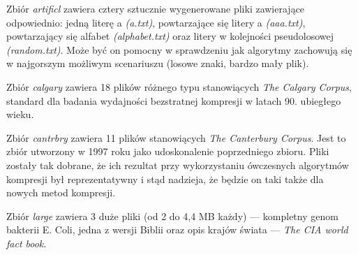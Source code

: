 Zbiór {\em artificl} zawiera cztery sztucznie wygenerowane pliki
zawierające odpowiednio: jedną literę a {\em (a.txt)}, powtarzające się
litery a {\em (aaa.txt)}, powtarzający się alfabet {\em (alphabet.txt)} oraz
litery w kolejności pseudolosowej {\em (random.txt)}. Może być on pomocny w
sprawdzeniu jak algorytmy zachowują się w najgorszym możliwym
scenariuszu (losowe znaki, bardzo mały plik).

Zbiór {\em calgary} zawiera 18 plików różnego typu stanowiących {\em The Calgary
Corpus}, standard dla badania wydajności bezstratnej kompresji w latach
90. ubiegłego wieku.

Zbiór {\em cantrbry} zawiera 11 plików stanowiących {\em The Canterbury Corpus}.
Jest to zbiór utworzony w 1997 roku jako udoskonalenie poprzedniego
zbioru. Pliki zostały tak dobrane, że ich rezultat przy wykorzystaniu
ówczesnych algorytmów kompresji był reprezentatywny i stąd nadzieja, że
będzie on taki także dla nowych metod kompresji.

Zbiór {\em large} zawiera 3 duże pliki (od 2 do 4,4 MB każdy) --- kompletny
genom bakterii E. Coli, jedna z wersji Biblii oraz opis krajów świata
--- {\em The CIA world fact book}.